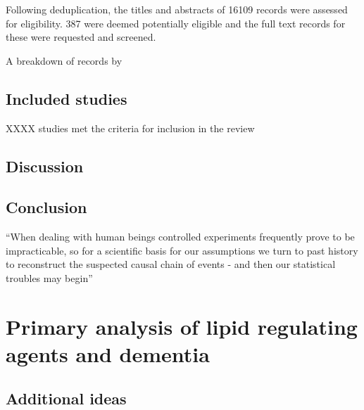 \documentclass[a4paper, nobind]{templates/ociamthesis}
\begin{document}
Following deduplication, the titles and abstracts of 16109 records were assessed for eligibility. 387 were deemed potentially eligible and the full text records for these were requested and screened.

A breakdown of records by

\hypertarget{included-studies}{%
\section{Included studies}\label{included-studies}}

XXXX studies met the criteria for inclusion in the review

\hypertarget{section}{%
\subsubsection{}\label{section}}

\hypertarget{discussion}{%
\section{Discussion}\label{discussion}}

\hypertarget{conclusion}{%
\section{Conclusion}\label{conclusion}}

\begin{savequote}
``When dealing with human beings controlled experiments frequently prove
to be impracticable, so for a scientific basis for our assumptions we
turn to past history to reconstruct the suspected causal chain of events
- and then our statistical troubles may begin''
\end{savequote}



\hypertarget{cprd-analysis}{%
\chapter{Primary analysis of lipid regulating agents and dementia}\label{cprd-analysis}}

\minitoc 

\hypertarget{additional-ideas-1}{%
\section{Additional ideas}\label{additional-ideas-1}}
\end{document}

